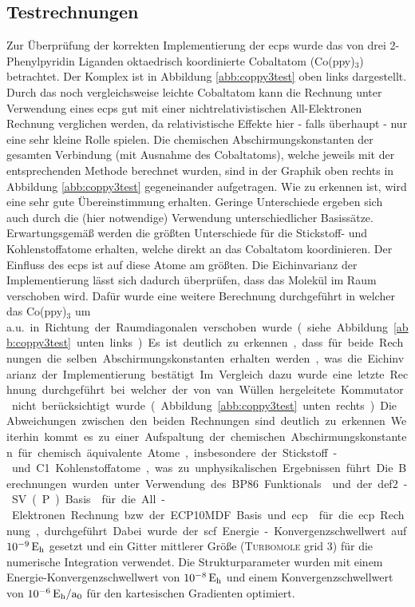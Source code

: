 	\subsection{Testrechnungen}
	Zur Überprüfung der korrekten Implementierung der \acp{ecp} wurde das von drei 2-Phenylpyridin Liganden oktaedrisch koordinierte Cobaltatom (Co(ppy)$_3$) betrachtet. Der Komplex ist in Abbildung \ref{abb:coppy3test} oben links dargestellt. Durch das noch vergleichsweise leichte Cobaltatom kann die Rechnung unter Verwendung eines \acp{ecp} gut mit einer nicht\-re\-la\-tivistischen All-Elektronen Rechnung verglichen werden, da relativistische Effekte hier - falls überhaupt - nur eine sehr kleine Rolle spielen. Die chemischen Abschirmungskonstanten der gesamten Verbindung (mit Ausnahme des Cobaltatoms), welche jeweils mit der entsprechenden Methode berechnet wurden, sind in der Graphik oben rechts in Abbildung \ref{abb:coppy3test} gegeneinander aufgetragen. Wie zu erkennen ist, wird eine sehr gute Übereinstimmung erhalten. Geringe Unterschiede ergeben sich auch durch die (hier notwendige) Verwendung unterschiedlicher Basissätze. Erwartungsgemäß werden die größten Unterschiede für die Stickstoff- und Kohlenstoffatome erhalten, welche direkt an das Cobaltatom koordinieren. Der Einfluss des \acp{ecp} ist auf diese Atome am größten. Die Eichinvarianz der Implementierung lässt sich dadurch überprüfen, dass das Molekül im Raum verschoben wird. Dafür wurde eine weitere Berechnung durchgeführt in welcher das Co(ppy)$_3$ um \unit[10]{a.u.} in Richtung der Raumdiagonalen verschoben wurde (siehe Abbildung \ref{abb:coppy3test} unten links). Es ist deutlich zu erkennen, dass für beide Rechnungen die selben Abschirmungskonstanten erhalten werden, was die Eichinvarianz der Implementierung bestätigt. Im Vergleich dazu wurde eine letzte Rechnung durchgeführt bei welcher der von van Wüllen hergeleitete Kommutator nicht berücksichtigt wurde (Abbildung \ref{abb:coppy3test} unten rechts). Die Abweichungen zwischen den beiden Rechnungen sind deutlich zu erkennen. Weiterhin kommt es zu einer Aufspaltung der chemischen Abschirmungskonstanten für chemisch äquivalente Atome, insbesondere der Stickstoff- und C1 Kohlenstoffatome, was zu unphysikalischen Ergebnissen führt. Die Berechnungen wurden unter Verwendung des BP86 Funktionals\supercite{perdew1986density,becke1988density} und der def2-SV(P) Basis\supercite{weigend2005balanced} für die All-Elektronen Rechnung bzw. der ECP10MDF Basis und \ac{ecp}\supercite{dolg1987energy} für die \ac{ecp} Rechnung, durchgeführt. Dabei wurde der \ac{scf} Energie-Konvergenzschwellwert auf $\unit[10^{-9}]{E_{\textrm{h}}}$ gesetzt und ein Gitter mittlerer Größe (\textsc{Turbomole} grid 3) für die numerische Integration\supercite{treutler1995efficient} verwendet. Die Strukturparameter wurden mit einem  Energie-Konvergenzschwellwert von $\unit[10^{-8}]{E_{\textrm{h}}}$ und einem Konvergenzschwellwert von $\unit[10^{-6}]{E_{\textrm{h}}/a_0}$ für den kartesischen Gradienten optimiert. 

